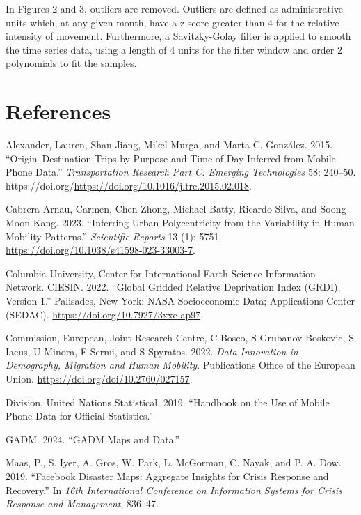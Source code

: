 \documentclass[
  11pt,
]{article}
\newlength{\cslhangindent}
\newenvironment{CSLReferences}[2] %
 {\begin{list}{}{%
  \setlength{\itemindent}{0pt}
  \setlength{\leftmargin}{0pt}
  \setlength{\parsep}{0pt}
  \ifodd #1
   \setlength{\leftmargin}{\cslhangindent}
   \setlength{\itemindent}{-1\cslhangindent}
  \fi
  \setlength{\itemsep}{#2\baselineskip}}}
 {\end{list}}
\begin{document}
In Figures 2 and 3, outliers are removed. Outliers are defined as
administrative units which, at any given month, have a z-score greater
than 4 for the relative intensity of movement. Furthermore, a
Savitzky-Golay filter is applied to smooth the time series data, using a
length of 4 units for the filter window and order 2 polynomials to fit
the samples.

\section*{References}\label{references}

\label{refs}
\begin{CSLReferences}{1}{0}
Alexander, Lauren, Shan Jiang, Mikel Murga, and Marta C. González. 2015.
{``Origin--Destination Trips by Purpose and Time of Day Inferred from
Mobile Phone Data.''} \emph{Transportation Research Part C: Emerging
Technologies} 58: 240--50.
https://doi.org/\url{https://doi.org/10.1016/j.trc.2015.02.018}.

Cabrera-Arnau, Carmen, Chen Zhong, Michael Batty, Ricardo Silva, and
Soong Moon Kang. 2023. {``Inferring Urban Polycentricity from the
Variability in Human Mobility Patterns.''} \emph{Scientific Reports} 13
(1): 5751. \url{https://doi.org/10.1038/s41598-023-33003-7}.

Columbia University, Center for International Earth Science Information
Network. CIESIN. 2022. {``Global Gridded Relative Deprivation Index
(GRDI), Version 1.''} Palisades, New York: NASA Socioeconomic Data;
Applications Center (SEDAC). \url{https://doi.org/10.7927/3xxe-ap97}.

Commission, European, Joint Research Centre, C Bosco, S
Grubanov-Boskovic, S Iacus, U Minora, F Sermi, and S Spyratos. 2022.
\emph{Data Innovation in Demography, Migration and Human Mobility}.
Publications Office of the European Union.
\url{https://doi.org/doi/10.2760/027157}.

Division, United Nations Statistical. 2019. {``Handbook on the Use of
Mobile Phone Data for Official Statistics.''}

GADM. 2024. {``GADM Maps and Data.''}

Maas, P., S. Iyer, A. Gros, W. Park, L. McGorman, C. Nayak, and P. A.
Dow. 2019. {``Facebook Disaster Maps: Aggregate Insights for Crisis
Response and Recovery.''} In \emph{16th International Conference on
Information Systems for Crisis Response and Management}, 836--47.


\end{CSLReferences}
\end{document}
